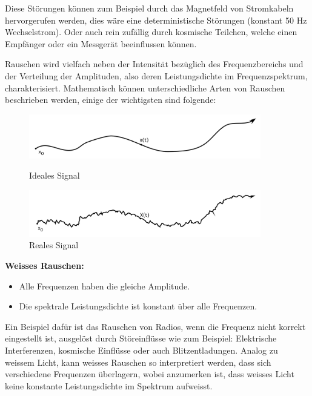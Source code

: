 Diese Störungen können zum Beispiel durch das Magnetfeld von Stromkabeln hervorgerufen werden, dies wäre eine deterministische Störungen (konstant 50 Hz Wechselstrom). Oder auch rein zufällig durch kosmische Teilchen, welche einen Empfänger oder ein Messgerät beeinflussen können.

Rauschen wird vielfach neben der Intensität bezüglich des Frequenzbereichs und der Verteilung der Amplituden, also deren Leistungsdichte im Frequenzspektrum, charakterisiert.
Mathematisch können unterschiedliche Arten von Rauschen beschrieben werden, einige der wichtigsten sind folgende: 


\begin{figure}
	\centering
	\begin{minipage}{0.45\textwidth}
		\centering
		\includegraphics[width=0.9\textwidth]{papers/brown/images/idealSignal.png}
		\caption{Ideales Signal}
		\label{idealSignal}
	\end{minipage}
	\hspace{0.05\linewidth}
	\begin{minipage}{0.45\textwidth}
		\centering
		\includegraphics[width=0.9\textwidth]{papers/brown/images/realSignal.png}
		\caption{Reales Signal}
		\label{realSignal}
	\end{minipage}
\end{figure}


\begin{definition}{\bf Weisses Rauschen:}
	\begin{itemize}
		\item Alle Frequenzen haben die gleiche Amplitude.
		\item Die spektrale Leistungsdichte ist konstant über alle Frequenzen. 
	\end{itemize}
\end{definition}
Ein Beispiel dafür ist das Rauschen von Radios, wenn die Frequenz nicht korrekt eingestellt ist, ausgelöst durch Störeinflüsse wie zum Beispiel: Elektrische Interferenzen, kosmische Einflüsse oder auch Blitzentladungen. Analog zu weissem Licht, kann weisses Rauschen so interpretiert werden, dass sich verschiedene Frequenzen überlagern, wobei anzumerken ist, dass weisses Licht keine konstante Leistungsdichte im Spektrum aufweisst.

